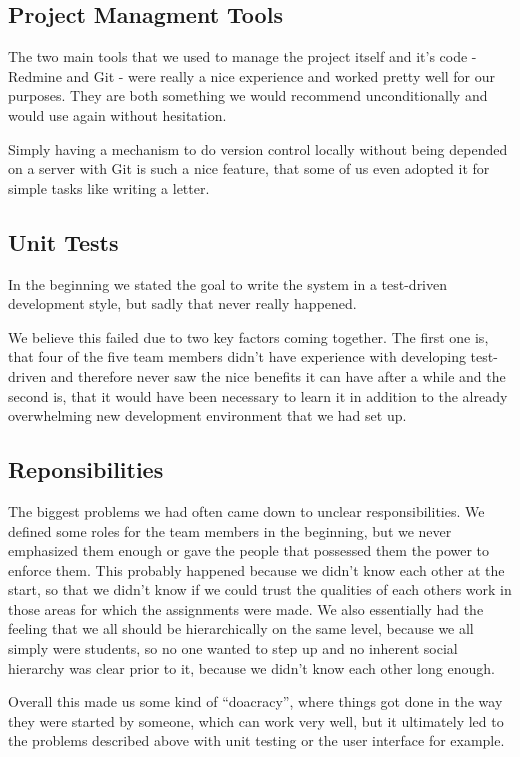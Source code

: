 \subsection{Project Managment Tools}

The two main tools that we used to manage the project itself and it's code - Redmine and Git - were really a nice experience and worked pretty well for our purposes. They are both something we would recommend unconditionally and would use again without hesitation. 

Simply having a mechanism to do version control locally without being depended on a server with Git is such a nice feature, that some of us even adopted it for simple tasks like writing a letter.

\subsection{Unit Tests}

In the beginning we stated the goal to write the system in a test-driven development style, but sadly that never really happened. 

We believe this failed due to two key factors coming together. The first one is, that four of the five team members didn't have experience with developing test-driven and therefore never saw the nice benefits it can have after a while and the second is, that it would have been necessary to learn it in addition to the already overwhelming new development environment that we had set up.

\subsection{Reponsibilities}

The biggest problems we had often came down to unclear responsibilities. We defined some roles for the team members in the beginning, but we never emphasized them enough or gave the people that possessed them the power to enforce them. This probably happened because we didn't know each other at the start, so that we didn't know if we could trust the qualities of each others work in those areas for which the assignments were made. We also essentially had the feeling that we all should be hierarchically on the same level, because we all simply were students, so no one wanted to step up and no inherent social hierarchy was clear prior to it, because we didn't know each other long enough.

Overall this made us some kind of \enquote{doacracy}, where things got done in the way they were started by someone, which can work very well, but it ultimately led to the problems described above with unit testing or the user interface for example.

